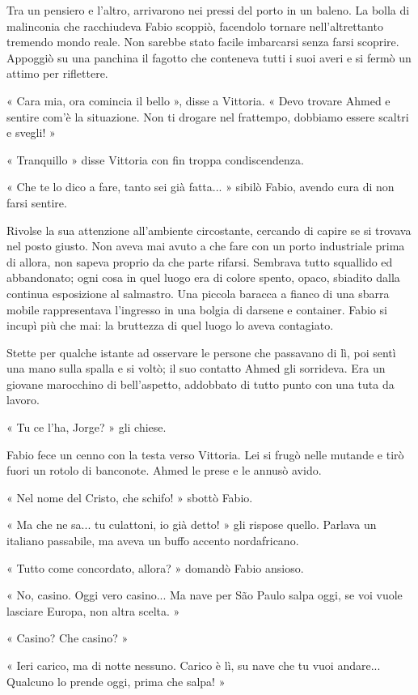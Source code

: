 Tra un pensiero e l'altro, arrivarono nei pressi del porto in un baleno. La bolla di malinconia che racchiudeva Fabio scoppiò, facendolo tornare nell'altrettanto tremendo mondo reale. Non sarebbe stato facile imbarcarsi senza farsi scoprire. Appoggiò su una panchina il fagotto che conteneva tutti i suoi averi e si fermò un attimo per riflettere.

« Cara mia, ora comincia il bello », disse a Vittoria. « Devo trovare Ahmed e sentire com'è la situazione. Non ti drogare nel frattempo, dobbiamo essere scaltri e svegli! »

« Tranquillo » disse Vittoria con fin troppa condiscendenza.

« Che te lo dico a fare, tanto sei già fatta... » sibilò Fabio, avendo cura di non farsi sentire.

Rivolse la sua attenzione all'ambiente circostante, cercando di capire se si trovava nel posto giusto. Non aveva mai avuto a che fare con un porto industriale prima di allora, non sapeva proprio da che parte rifarsi. Sembrava tutto squallido ed abbandonato; ogni cosa in quel luogo era di colore spento, opaco, sbiadito dalla continua esposizione al salmastro. Una piccola baracca a fianco di una sbarra mobile rappresentava l'ingresso in una bolgia di darsene e container. Fabio si incupì più che mai: la bruttezza di quel luogo lo aveva contagiato.

Stette per qualche istante ad osservare le persone che passavano di lì, poi sentì una mano sulla spalla e si voltò; il suo contatto Ahmed gli sorrideva. Era un giovane marocchino di bell'aspetto, addobbato di tutto punto con una tuta da lavoro.

« Tu ce l'ha, Jorge? » gli chiese.

Fabio fece un cenno con la testa verso Vittoria. Lei si frugò nelle mutande e tirò fuori un rotolo di banconote. Ahmed le prese e le annusò avido.

« Nel nome del Cristo, che schifo! » sbottò Fabio.

« Ma che ne sa... tu culattoni, io già detto! » gli rispose quello. Parlava un italiano passabile, ma aveva un buffo accento nordafricano.

« Tutto come concordato, allora? » domandò Fabio ansioso.

« No, casino. Oggi vero casino... Ma nave per São Paulo salpa oggi, se voi vuole lasciare Europa, non altra scelta. »

« Casino? Che casino? »

« Ieri carico, ma di notte nessuno. Carico è lì, su nave che tu vuoi andare... Qualcuno lo prende oggi, prima che salpa! »

